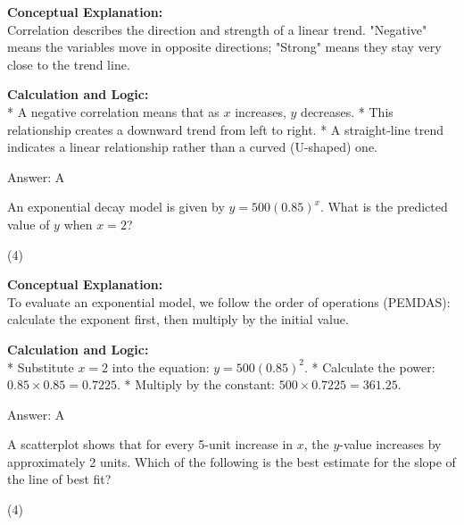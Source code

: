 \documentclass[11pt,paper=a4,answers]{exam}
\begin{document}
\begin{questions}
\begin{solution}
\textbf{Conceptual Explanation:} \\
Correlation describes the direction and strength of a linear trend. "Negative" means the variables move in opposite directions; "Strong" means they stay very close to the trend line.

\vspace{30pt}

\textbf{Calculation and Logic:} \\
* A negative correlation means that as $x$ increases, $y$ decreases.
* This relationship creates a downward trend from left to right.
* A straight-line trend indicates a linear relationship rather than a curved (U-shaped) one.

\vspace{30pt}

Answer: \colorbox{yellow!100}{A}
\end{solution}

\vspace{60pt}

\question
An exponential decay model is given by $y = 500(0.85)^x$. What is the predicted value of $y$ when $x = 2$?
\begin{tasks}(4)
\end{tasks}

\begin{solution}
\textbf{Conceptual Explanation:} \\
To evaluate an exponential model, we follow the order of operations (PEMDAS): calculate the exponent first, then multiply by the initial value.

\vspace{30pt}

\textbf{Calculation and Logic:} \\
* Substitute $x = 2$ into the equation: $y = 500(0.85)^2$.
* Calculate the power: $0.85 \times 0.85 = 0.7225$.
* Multiply by the constant: $500 \times 0.7225 = 361.25$.

\vspace{30pt}

Answer: \colorbox{yellow!100}{A}
\end{solution}

\vspace{60pt}

\question
A scatterplot shows that for every 5-unit increase in $x$, the $y$-value increases by approximately 2 units. Which of the following is the best estimate for the slope of the line of best fit?
\begin{tasks}(4)
\end{tasks}


\end{questions}
\end{document}
